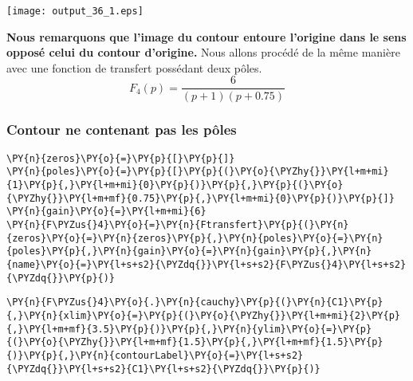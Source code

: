 \begin{center}
    \texttt{[image: output\_36\_1.eps]}
\end{center}
\textbf{Nous remarquons que l'image du contour entoure l'origine dans le
sens opposé celui du contour d'origine.} Nous allons procédé de la même
manière avec une fonction de transfert possédant deux pôles.
\[
F_4(p)=\dfrac{6}{(p+1)(p+0.75)}
\] 
\subsubsection{Contour ne contenant pas les pôles}
\begin{tcolorbox}[breakable, size=fbox, boxrule=1pt, pad at break*=1mm,colback=cellbackground, colframe=cellborder]
\begin{Verbatim}[commandchars=\\\{\}]
\PY{n}{zeros}\PY{o}{=}\PY{p}{[}\PY{p}{]}
\PY{n}{poles}\PY{o}{=}\PY{p}{[}\PY{p}{(}\PY{o}{\PYZhy{}}\PY{l+m+mi}{1}\PY{p}{,}\PY{l+m+mi}{0}\PY{p}{)}\PY{p}{,}\PY{p}{(}\PY{o}{\PYZhy{}}\PY{l+m+mf}{0.75}\PY{p}{,}\PY{l+m+mi}{0}\PY{p}{)}\PY{p}{]}
\PY{n}{gain}\PY{o}{=}\PY{l+m+mi}{6}
\PY{n}{F\PYZus{}4}\PY{o}{=}\PY{n}{Ftransfert}\PY{p}{(}\PY{n}{zeros}\PY{o}{=}\PY{n}{zeros}\PY{p}{,}\PY{n}{poles}\PY{o}{=}\PY{n}{poles}\PY{p}{,}\PY{n}{gain}\PY{o}{=}\PY{n}{gain}\PY{p}{,}\PY{n}{name}\PY{o}{=}\PY{l+s+s2}{\PYZdq{}}\PY{l+s+s2}{F\PYZus{}4}\PY{l+s+s2}{\PYZdq{}}\PY{p}{)}
\end{Verbatim}
\end{tcolorbox}
\begin{tcolorbox}[breakable, size=fbox, boxrule=1pt, pad at break*=1mm,colback=cellbackground, colframe=cellborder]
\begin{Verbatim}[commandchars=\\\{\}]
\PY{n}{F\PYZus{}4}\PY{o}{.}\PY{n}{cauchy}\PY{p}{(}\PY{n}{C1}\PY{p}{,}\PY{n}{xlim}\PY{o}{=}\PY{p}{(}\PY{o}{\PYZhy{}}\PY{l+m+mi}{2}\PY{p}{,}\PY{l+m+mf}{3.5}\PY{p}{)}\PY{p}{,}\PY{n}{ylim}\PY{o}{=}\PY{p}{(}\PY{o}{\PYZhy{}}\PY{l+m+mf}{1.5}\PY{p}{,}\PY{l+m+mf}{1.5}\PY{p}{)}\PY{p}{,}\PY{n}{contourLabel}\PY{o}{=}\PY{l+s+s2}{\PYZdq{}}\PY{l+s+s2}{C1}\PY{l+s+s2}{\PYZdq{}}\PY{p}{)}
\end{Verbatim}
\end{tcolorbox}
